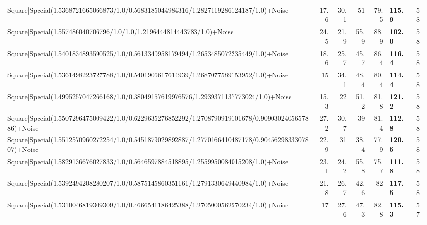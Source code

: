 \begin{tabular}{lrrrrlr}
 Square|Special(1.5368721665066873/1.0/0.5683185044984316/1.2827119286124187/1.0)+Noise                                        &            17.6 &           30.1 &            51   &            79.5 & \textbf{115.9}  &           58 \\
 Square|Special(1.557486040706796/1.0/1.0/1.2196444814443783/1.0)+Noise                                                        &            24.5 &           21.9 &            55.9 &            88.9 & \textbf{102.0}  &           58 \\
 Square|Special(1.5401834893590525/1.0/0.5613340958179494/1.2653485072235449/1.0)+Noise                                        &            18.6 &           25.7 &            45.7 &            86.4 & \textbf{116.4}  &           58 \\
 Square|Special(1.5361498223727788/1.0/0.5401906617614939/1.2687077589153952/1.0)+Noise                                        &            15   &           34.1 &            48.4 &            80.4 & \textbf{114.4}  &           58 \\
 Square|Special(1.4995257047266168/1.0/0.38049167619976576/1.2939371137773024/1.0)+Noise                                       &            15.3 &           22   &            51.2 &            81.8 & \textbf{121.2}  &           58 \\
 Square|Special(1.5507296475009422/1.0/0.6229635276852292/1.2708790919101678/0.9090302405657886)+Noise                         &            27.2 &           30.7 &            39   &            81.4 & \textbf{112.8}  &           58 \\
 Square|Special(1.5512570960272254/1.0/0.5451879029892887/1.2770166410487178/0.9045629833307807)+Noise                         &            22.9 &           31   &            38.4 &            77.9 & \textbf{120.5}  &           58 \\
 Square|Special(1.5829136676027833/1.0/0.5646597884518895/1.2559950084015208/1.0)+Noise                                        &            23.1 &           24.2 &            55.8 &            75.7 & \textbf{111.8}  &           58 \\
 Square|Special(1.5392494208280207/1.0/0.5875145860351161/1.2791330649440984/1.0)+Noise                                        &            21.8 &           26.7 &            42.6 &            82   & \textbf{117.5}  &           58 \\
 Square|Special(1.5310046819309309/1.0/0.4666541186425388/1.2705000562570234/1.0)+Noise                                        &            17   &           27.6 &            47.3 &            82.8 & \textbf{115.3}  &           57 \\

\end{tabular}
